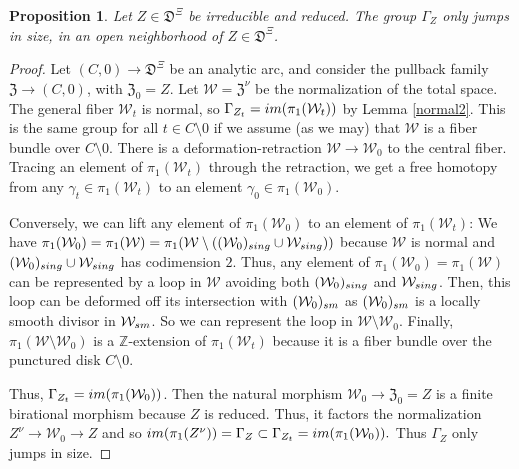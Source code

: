 \documentclass[10pt,letterpaper,english,reqno]{amsart}
\numberwithin{equation}{subsection}
\newcommand\cW{{\mathcal W}}
\newcommand\cZ{{\mathcal Z}}
\newcommand\fD{{\mathfrak D}}
\newcommand\fZ{{\mathfrak Z}}
\newcommand\bP{{\mathbb P}}
\newcommand\Z{{\mathbb Z}}
\newtheorem{proposition}[theorem]{Proposition}
\theoremstyle{definition}
\begin{document}
\begin{proposition}\label{pi1} Let $Z\in \fD^{\Xi}$ be irreducible
and reduced. The group $\Gamma_Z$ only jumps in size,
in an open neighborhood of $Z\in \fD^{\Xi}$.
\end{proposition}

\begin{proof}
Let $(C,0)\to \fD^{\Xi}$
be an analytic arc, and consider the pullback
family $\fZ\to (C,0)$, with $\fZ_0=Z$. Let $\cW = \fZ^\nu$
be the normalization of the total space. The general fiber $\cW_t$ is normal, so
$\Gamma_{Z_t} = {\rm im}(\pi_1(\cW_t))$ by Lemma
\ref{normal2}.
This is the same group for all $t\in C\setminus 0$
if we assume (as we may) that $\cW$ is a fiber bundle
over $C\setminus 0$. There is a deformation-retraction
$\cW\to \cW_0$ to the central
fiber. Tracing an element of $\pi_1(\cW_t)$ through the
retraction, we get a free homotopy from any $\gamma_t\in \pi_1(\cW_t)$
to an element $\gamma_0\in \pi_1(\cW_0)$.

Conversely, we can lift any element of $\pi_1(\cW_0)$ 
to an element of $\pi_1(\cW_t)$: We have $\pi_1(\cW_0)=\pi_1(\cW) = 
\pi_1(\cW\setminus ((\cW_0)_{\rm sing}\cup \cW_{\rm sing}))$ because $\cW$ is
normal and $(\cW_0)_{\rm sing}\cup \cW_{\rm sing}$ 
has codimension $2$. Thus, any element of $\pi_1(\cW_0)=\pi_1(\cW)$ can
be represented by a loop in $\cW$ avoiding both $(\cW_0)_{\rm sing}$
and $\cW_{\rm sing}$. Then, 
this loop can be deformed off its intersection with $(\cW_0)_{\rm sm}$
as $(\cW_0)_{\rm sm}$ is a locally smooth divisor in $\cW_{\rm sm}$.
So we can represent the loop in $\cW\setminus \cW_0$.
Finally, $\pi_1(\cW\setminus \cW_0)$ is a $\Z$-extension of $\pi_1(\cW_t)$
because it is a fiber bundle over the punctured disk $C\setminus 0$.

Thus, $\Gamma_{Z_t}={\rm im}(\pi_1(\cW_0))$.
Then the natural morphism
$\cW_0\to \fZ_0=Z$
is a finite birational
morphism because $Z$ is reduced.
Thus, it factors the normalization
$Z^\nu \to \cW_0 \to Z$
and so ${\rm im}(\pi_1(Z^\nu))=
\Gamma_{Z}\subset \Gamma_{Z_t}= {\rm im}(\pi_1(\cW_0)).$ Thus
$\Gamma_Z$ only jumps in size.
\end{proof}
\end{document}
